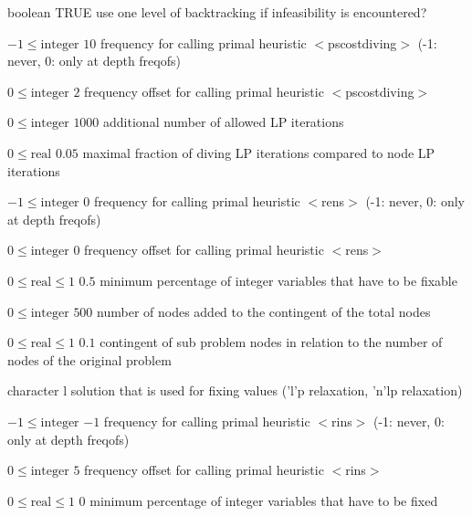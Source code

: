 %
{boolean}%
{TRUE}%
{use one level of backtracking if infeasibility is encountered?}%
{}

%
{$-1\leq\textrm{integer}$}%
{$10$}%
{frequency for calling primal heuristic $<$pscostdiving$>$ (-1: never, 0: only at depth freqofs)}%
{}

%
{$0\leq\textrm{integer}$}%
{$2$}%
{frequency offset for calling primal heuristic $<$pscostdiving$>$}%
{}

%
{$0\leq\textrm{integer}$}%
{$1000$}%
{additional number of allowed LP iterations}%
{}

%
{$0\leq\textrm{real}$}%
{$0.05$}%
{maximal fraction of diving LP iterations compared to node LP iterations}%
{}

%
{$-1\leq\textrm{integer}$}%
{$0$}%
{frequency for calling primal heuristic $<$rens$>$ (-1: never, 0: only at depth freqofs)}%
{}

%
{$0\leq\textrm{integer}$}%
{$0$}%
{frequency offset for calling primal heuristic $<$rens$>$}%
{}

%
{$0\leq\textrm{real}\leq1$}%
{$0.5$}%
{minimum percentage of integer variables that have to be fixable }%
{}

%
{$0\leq\textrm{integer}$}%
{$500$}%
{number of nodes added to the contingent of the total nodes}%
{}

%
{$0\leq\textrm{real}\leq1$}%
{$0.1$}%
{contingent of sub problem nodes in relation to the number of nodes of the original problem}%
{}

%
{character}%
{l}%
{solution that is used for fixing values ('l'p relaxation, 'n'lp relaxation)}%
{}

%
{$-1\leq\textrm{integer}$}%
{$-1$}%
{frequency for calling primal heuristic $<$rins$>$ (-1: never, 0: only at depth freqofs)}%
{}

%
{$0\leq\textrm{integer}$}%
{$5$}%
{frequency offset for calling primal heuristic $<$rins$>$}%
{}

%
{$0\leq\textrm{real}\leq1$}%
{$0$}%
{minimum percentage of integer variables that have to be fixed }%
{}

